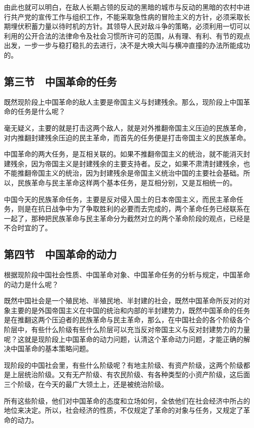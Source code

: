 由此也就可以明白，在敌人长期占领的反动的黑暗的城市与反动的黑暗的农村中进行共产党的宣传工作与组织工作，不能采取急性病的冒险主义的方针，必须采取长期埋伏积蓄力量以待时机的方针。其领导人民对敌斗争的策略，必须利用一切可以利用的公开合法的法律命令及社会习惯所许可的范围，从有理、有利、有节的观点出发，一步一步与稳打稳扎的去进行，决不是大唤大叫与横冲直撞的办法所能成功的。

\subsection{第三节　中国革命的任务}

既然现阶段上中国革命的敌人主要是帝国主义与封建残余。那么，现阶段上中国革命的任务是什么呢？

毫无疑义，主要的就是打击这两个敌人，就是对外推翻帝国主义压迫的民族革命，对内推翻封建残余压迫的民主革命，而首先的任务便是打击帝国主义的民族革命。

中国革命的两大任务，是互相关联的。如果不推翻帝国主义的统治，就不能消灭封建残余，因为帝国主义是封建残余的主要支持者。反之，如果不肃清封建残余，也不能推翻帝国主义的统治，因为封建残余是帝国主义统治中国的主要社会基础。所以，民族革命与民主革命这样两个基本任务，是互相分别，又是互相统一的。

中国今天的民族革命任务，主要是反对侵入国土的日本帝国主义，而民主革命任务，则是在抗日战争中为了争取胜利的必要而去完成的，两个革命任务已经联系在一起了，那种把民族革命与民主革命分为截然对立的两个革命阶段的观点，已经是不合时宜的了。

\subsection{第四节　中国革命的动力}

根据现阶段中国社会性质、中国革命对象、中国革命任务的分析与规定，中国革命的动力是什么呢？

既然中国社会是一个殖民地、半殖民地、半封建的社会，既然中国革命所反对的对象主要的是外国帝国主义在中国的统治和内部的半封建势力，既然中国革命的任务是在推翻这两个压迫者的民族革命与民主革命，那么，在中国社会的各个阶级各个阶层中，有些什么阶级有些什么阶层可以充当反对帝国主义与反对封建势力的力量呢？这就是现阶段上中国革命的动力问题，认清这个革命动力问题，才能正确的解决中国革命的基本策略问题。

现阶段的中国社会里，有些什么阶级呢？有地主阶级、有资产阶级，这两个阶级都是上层统治阶级。又有无产阶级、有农民阶级、有各种类型的小资产阶级，这后面三个阶级，在今天的最广大领土上，还是被统治阶级。

所有这些阶级，他们对中国革命的态度和立场如何，全依他们在社会经济中所占的地位来决定。所以，社会经济的性质，不仅规定了革命的对象与任务，又规定了革命的动力。

